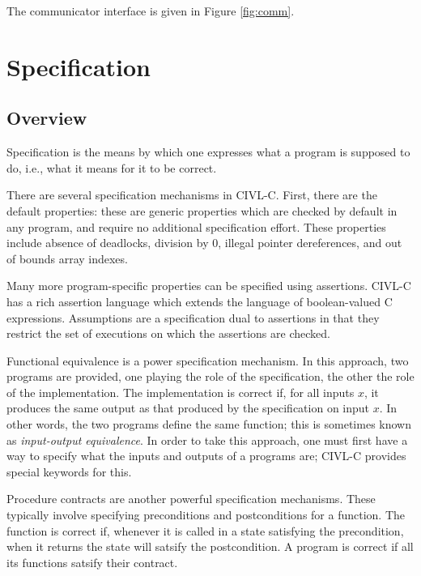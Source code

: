 The communicator interface is given in Figure \ref{fig:comm}.


\chapter{Specification}

\section{Overview}

Specification is the means by which one expresses what a program is
supposed to do, i.e., what it means for it to be correct.

There are several specification mechanisms in CIVL-C. First, there are
the default properties: these are generic properties which are checked
by default in any program, and require no additional specification
effort. These properties include absence of deadlocks, division by 0,
illegal pointer dereferences, and out of bounds array indexes.

Many more program-specific properties can be specified using
assertions. CIVL-C has a rich assertion language which extends the
language of boolean-valued C expressions. Assumptions are a
specification dual to assertions in that they restrict the set
of executions on which the assertions are checked.

Functional equivalence is a power specification mechanism. In this
approach, two programs are provided, one playing the role of the
specification, the other the role of the implementation. The
implementation is correct if, for all inputs $x$, it produces the same
output as that produced by the specification on input $x$. In other
words, the two programs define the same function; this is sometimes
known as \emph{input-output equivalence}. In order to take this
approach, one must first have a way to specify what the inputs and
outputs of a programs are; CIVL-C provides special keywords for this.

Procedure contracts are another powerful specification mechanisms.
These typically involve specifying preconditions and postconditions
for a function. The function is correct if, whenever it is called in a
state satisfying the precondition, when it returns the state will
satsify the postcondition. A program is correct if all its functions
satsify their contract.

